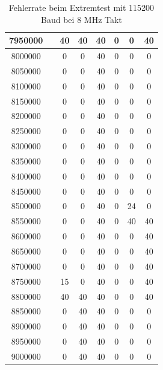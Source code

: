 \begin{table}[H]
\begin{center}
\begin{tabular}{| c  r || c | c | c | c | c | c |}
7950000  &    &  40   &  40      &   40     &  0   &  0   &  40 \\
    \hline
8000000  &    &  0    &  0       &   40     &  0   &  0   &  0 \\
8050000  &    &  0    &  0       &   40     &  0   &  0   &  0 \\
8100000  &    &  0    &  0       &   40     &  0   &  0   &  0 \\
8150000  &    &  0    &  0       &   40     &  0   &  0   &  0 \\
    \hline
8200000  &    &  0    &  0       &   40     &  0   &  0   &  0 \\
8250000  &    &  0    &  0       &   40     &  0   &  0   &  0 \\
8300000  &    &  0    &  0       &   40     &  0   &  0   &  0 \\
8350000  &    &  0    &  0       &   40     &  0   &  0   &  0 \\
    \hline
8400000  &    &  0    &  0       &   40     &  0   &  0   &  0 \\
8450000  &    &  0    &  0       &   40     &  0   &  0   &  0 \\
8500000  &    &  0    &  0       &   40     &  0   &  24  &  0 \\
8550000  &    &  0    &  0       &   40     &  0   &  40  &  40 \\
    \hline
8600000  &    &  0    &  0       &   40     &  0   &  0   &  40 \\
8650000  &    &  0    &  0       &   40     &  0   &  0   &  40 \\
8700000  &    &  0    &  0       &   40     &  0   &  0   &  40 \\
8750000  &    &  15   &  0       &   40     &  0   &  0   &  40 \\
    \hline
8800000  &    &  40   &  40      &   40     &  0   &  0   &  40 \\
8850000  &    &  0    &  40      &   40     &  0   &  0   &  0 \\
8900000  &    &  0    &  40      &   40     &  0   &  0   &  0 \\
8950000  &    &  0    &  40      &   40     &  0   &  0   &  0 \\
9000000  &    &  0    &  40      &   40     &  0   &  0   &  0 \\
    \hline
    \end{tabular}
  \end{center}
  \caption{Fehlerrate beim Extremtest mit 115200 Baud bei 8 MHz Takt}
  \label{tab:ExtremErrs}
\end{table}

